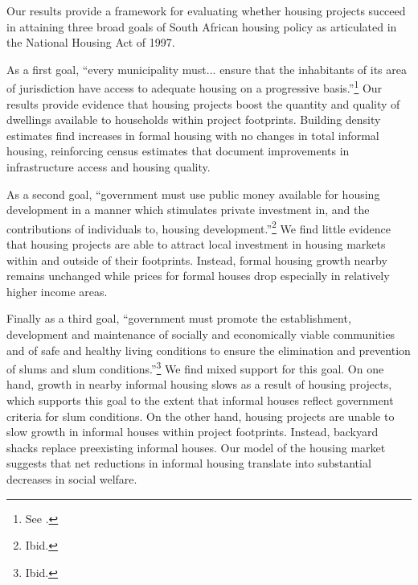 \documentclass[12pt]{article}
\begin{document}
Our results provide a framework for evaluating whether housing projects succeed in attaining three broad goals of South African housing policy as articulated in the National Housing Act of 1997.

As a first goal, ``every municipality must... ensure that the inhabitants of its area of jurisdiction have access to adequate housing on a progressive basis.''\footnote{See \cite{housingact}.}  Our results provide evidence that housing projects boost the quantity and quality of dwellings available to households within project footprints.  Building density estimates find increases in formal housing with no changes in total informal housing, reinforcing census estimates that document improvements in infrastructure access and housing quality.

As a second goal, ``government must use public money available for housing development in a manner which stimulates private investment in, and the contributions of individuals to, housing development.''\footnote{Ibid.}    We find little evidence that housing projects are able to attract local investment in housing markets within and outside of their footprints.  Instead, formal housing growth nearby remains unchanged while prices for formal houses drop especially in relatively higher income areas.

Finally as a third goal, ``government must promote the establishment, development and maintenance of socially and economically viable communities and of safe and healthy living conditions to ensure the elimination and prevention of slums and slum conditions.''\footnote{Ibid.}  We find mixed support for this goal.  On one hand, growth in nearby informal housing slows as a result of housing projects, which supports this goal to the extent that informal houses reflect government criteria for slum conditions.  On the other hand, housing projects are unable to slow growth in informal houses within project footprints.  Instead, backyard shacks replace preexisting informal houses.  Our model of the housing market suggests that net reductions in informal housing translate into substantial decreases in social welfare.  
\end{document}
